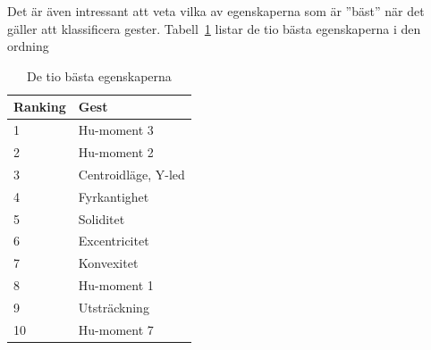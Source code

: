 \documentclass[../rapport_MVEX01-11-05]{subfiles}
\begin{document}
Det är även intressant att veta vilka av egenskaperna som är ''bäst'' när det
gäller att klassificera gester. Tabell~\ref{tab:bestfeats} listar de tio bästa
egenskaperna i den ordning 

\begin{table}[tb]
	\centering
	\caption{De tio bästa egenskaperna}
	\label{tab:bestfeats}
	\begin{tabular}{ll}
		\toprule
		Ranking & Gest \\
		\midrule
		1 & Hu-moment 3 \\
		2 & Hu-moment 2 \\
		3 & Centroidläge, Y-led \\
		4 & Fyrkantighet \\
		5 & Soliditet \\
		6 & Excentricitet \\
		7 & Konvexitet \\
		8 & Hu-moment 1 \\
		9 & Utsträckning \\
		10 & Hu-moment 7 \\
		\bottomrule
	\end{tabular}
\end{table}
\end{document}
